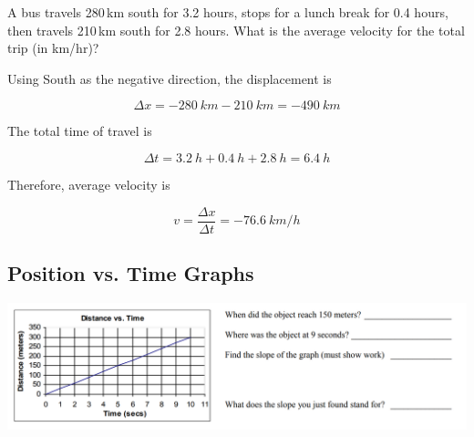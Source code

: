 \documentclass[../main-physics-problems.tex]{subfiles}
\begin{document}
\begin{questions}

\question
A bus travels 280\,km south for 3.2 hours, stops for a lunch break for 0.4 hours, then travels 210\,km south for 2.8 hours. What is the average velocity for the total trip (in km/hr)?

\begin{solution}
    Using South as the negative direction, the displacement is
    
    \begin{equation*}
        \Delta x = -\SI{280}{km} - \SI{210}{km} = \SI{-490}{km}
    \end{equation*}

    The total time of travel is

    \begin{equation*}
        \Delta t = \SI{3.2}{h} + \SI{0.4}{h} + \SI{2.8}{h} = \SI{6.4}{h}
    \end{equation*}

    Therefore, average velocity is

    \begin{equation*}
        v = \frac{\Delta x}{\Delta t} = \boxed{\SI{-76.6}{km/h}}
    \end{equation*}
\end{solution}

\clearpage
\begin{EnvUplevel}
    \subsection{Position vs. Time Graphs}
\end{EnvUplevel}

\question
\phantom{.}

\begin{center}
    \includegraphics[width=14cm]{documents/figures/murray-graphing-speed-slope-2.png}
\end{center}


\end{questions}
\end{document}
